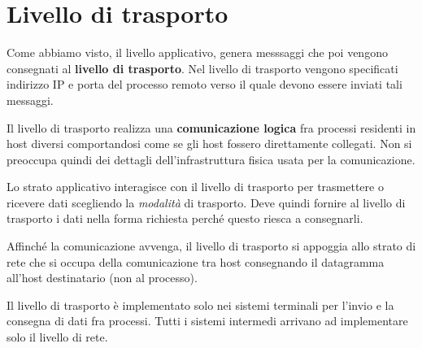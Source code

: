 \chapter{Livello di trasporto}
Come abbiamo visto, il livello applicativo, genera messsaggi che poi 
vengono consegnati al \textbf{livello di trasporto}. Nel livello di 
trasporto vengono specificati indirizzo IP e porta del processo remoto 
verso il quale devono essere inviati tali messaggi.

Il livello di trasporto realizza una \textbf{comunicazione logica} fra 
processi residenti in host diversi comportandosi come se gli host 
fossero direttamente collegati. Non si preoccupa quindi dei dettagli 
dell'infrastruttura fisica usata per la comunicazione.

Lo strato applicativo interagisce con il livello di trasporto per 
trasmettere o ricevere dati scegliendo la \emph{modalità} di trasporto.
Deve quindi fornire al livello di trasporto i dati nella forma 
richiesta perché questo riesca a consegnarli.

Affinché la comunicazione avvenga, il livello di trasporto si appoggia 
allo strato di rete che si occupa della comunicazione tra host 
consegnando il datagramma all'host destinatario (non al processo).

Il livello di trasporto è implementato solo nei sistemi terminali per 
l'invio e la consegna di dati fra processi. Tutti i sistemi intermedi 
arrivano ad implementare solo il livello di rete.

